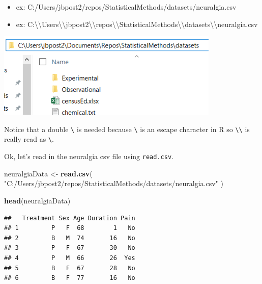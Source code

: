 \documentclass[
]{book}
\newenvironment{Shaded}{\begin{snugshade}}{\end{snugshade}}
\newcommand{\KeywordTok}[1]{\textcolor[rgb]{0.13,0.29,0.53}{\textbf{#1}}}
\newcommand{\NormalTok}[1]{#1}
\newcommand{\StringTok}[1]{\textcolor[rgb]{0.31,0.60,0.02}{#1}}
\providecommand{\tightlist}{%
  \setlength{\itemsep}{0pt}\setlength{\parskip}{0pt}}
\theoremstyle{definition}
\theoremstyle{definition}
\theoremstyle{definition}
\theoremstyle{remark}
\begin{document}
\begin{itemize}
\tightlist
\item
  ex: C:/Users/jbpost2/repos/StatisticalMethods/datasets/neuralgia.csv\\
\item
  ex: C:\textbackslash{}\textbackslash{}Users\textbackslash{}\textbackslash{}jbpost2\textbackslash{}\textbackslash{}repos\textbackslash{}\textbackslash{}StatisticalMethods\textbackslash{}\textbackslash{}datasets\textbackslash{}\textbackslash{}neuralgia.csv
\end{itemize}

\begin{center}\includegraphics[width=0.8\linewidth]{img/pathVis} \end{center}

Notice that a double \texttt{\textbackslash{}} is needed because \texttt{\textbackslash{}} is an escape character in R so \texttt{\textbackslash{}\textbackslash{}} is really read as \texttt{\textbackslash{}}.

Ok, let's read in the neuralgia csv file using \texttt{read.csv}.

\begin{Shaded}
\begin{Highlighting}[]
\NormalTok{neuralgiaData <-}\StringTok{ }\KeywordTok{read.csv}\NormalTok{(}
           \StringTok{"C:/Users/jbpost2/repos/StatisticalMethods/datasets/neuralgia.csv"}
\NormalTok{           )}
\end{Highlighting}
\end{Shaded}

\begin{Shaded}
\begin{Highlighting}[]
\KeywordTok{head}\NormalTok{(neuralgiaData)}
\end{Highlighting}
\end{Shaded}

\begin{verbatim}
##   Treatment Sex Age Duration Pain
## 1         P   F  68        1   No
## 2         B   M  74       16   No
## 3         P   F  67       30   No
## 4         P   M  66       26  Yes
## 5         B   F  67       28   No
## 6         B   F  77       16   No
\end{verbatim}
\end{document}
